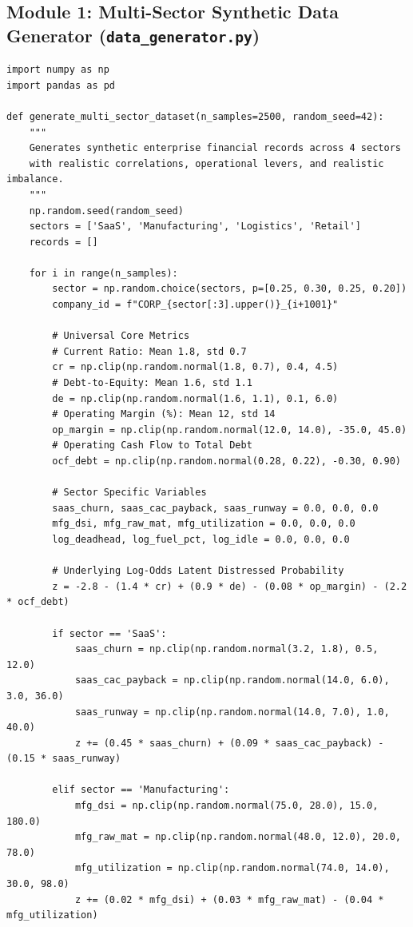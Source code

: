 \documentclass[11pt, a4paper]{article}
\begin{document}
\subsection{Module 1: Multi-Sector Synthetic Data Generator (\texttt{data\_generator.py})}
\begin{verbatim}
import numpy as np
import pandas as pd

def generate_multi_sector_dataset(n_samples=2500, random_seed=42):
    """
    Generates synthetic enterprise financial records across 4 sectors
    with realistic correlations, operational levers, and realistic imbalance.
    """
    np.random.seed(random_seed)
    sectors = ['SaaS', 'Manufacturing', 'Logistics', 'Retail']
    records = []
    
    for i in range(n_samples):
        sector = np.random.choice(sectors, p=[0.25, 0.30, 0.25, 0.20])
        company_id = f"CORP_{sector[:3].upper()}_{i+1001}"
        
        # Universal Core Metrics
        # Current Ratio: Mean 1.8, std 0.7
        cr = np.clip(np.random.normal(1.8, 0.7), 0.4, 4.5)
        # Debt-to-Equity: Mean 1.6, std 1.1
        de = np.clip(np.random.normal(1.6, 1.1), 0.1, 6.0)
        # Operating Margin (%): Mean 12, std 14
        op_margin = np.clip(np.random.normal(12.0, 14.0), -35.0, 45.0)
        # Operating Cash Flow to Total Debt
        ocf_debt = np.clip(np.random.normal(0.28, 0.22), -0.30, 0.90)
        
        # Sector Specific Variables
        saas_churn, saas_cac_payback, saas_runway = 0.0, 0.0, 0.0
        mfg_dsi, mfg_raw_mat, mfg_utilization = 0.0, 0.0, 0.0
        log_deadhead, log_fuel_pct, log_idle = 0.0, 0.0, 0.0
        
        # Underlying Log-Odds Latent Distressed Probability
        z = -2.8 - (1.4 * cr) + (0.9 * de) - (0.08 * op_margin) - (2.2 * ocf_debt)
        
        if sector == 'SaaS':
            saas_churn = np.clip(np.random.normal(3.2, 1.8), 0.5, 12.0)
            saas_cac_payback = np.clip(np.random.normal(14.0, 6.0), 3.0, 36.0)
            saas_runway = np.clip(np.random.normal(14.0, 7.0), 1.0, 40.0)
            z += (0.45 * saas_churn) + (0.09 * saas_cac_payback) - (0.15 * saas_runway)
            
        elif sector == 'Manufacturing':
            mfg_dsi = np.clip(np.random.normal(75.0, 28.0), 15.0, 180.0)
            mfg_raw_mat = np.clip(np.random.normal(48.0, 12.0), 20.0, 78.0)
            mfg_utilization = np.clip(np.random.normal(74.0, 14.0), 30.0, 98.0)
            z += (0.02 * mfg_dsi) + (0.03 * mfg_raw_mat) - (0.04 * mfg_utilization)
            

\end{verbatim}
\end{document}
